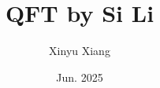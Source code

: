 \documentclass[10pt]{article}
\title{\textbf{QFT by Si Li}}
\author{Xinyu Xiang}
\date{Jun. 2025}
\begin{document}
\maketitle

\label{LastPage}
\end{document}
